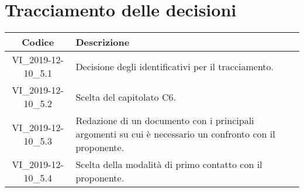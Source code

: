 \section*{Tracciamento delle decisioni}

\begin{center}
	\begin{longtable}{|c|p{12.25cm}|}
	\hline
	\rowcolor{lighter-grayer}
	\textbf{Codice} & \textbf{Descrizione} \\
	\hline
	\endfirsthead
	
	\hline
	VI\_2019-12-10\_5.1 & Decisione degli identificativi per il tracciamento. \\
	\hline
	VI\_2019-12-10\_5.2 & Scelta del capitolato C6. \\
	\hline
	VI\_2019-12-10\_5.3 & Redazione di un documento con i principali argomenti su cui è necessario un confronto con il proponente. \\
	\hline
	VI\_2019-12-10\_5.4 & Scelta della modalità di primo contatto con il proponente. \\
	\hline

	\end{longtable}
\end{center}